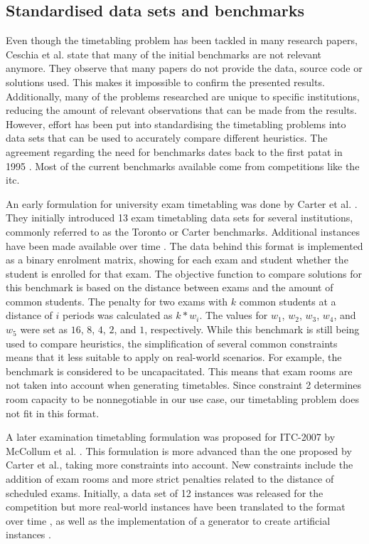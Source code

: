 \subsection{Standardised data sets and benchmarks}

Even though the timetabling problem has been tackled in many research papers, Ceschia et al.\cite{ceschia2022} state that many of the initial benchmarks are not relevant anymore. They observe that many papers do not provide the data, source code or solutions used. This makes it impossible to confirm the presented results. Additionally, many of the problems researched are unique to specific institutions, reducing the amount of relevant observations that can be made from the results. However, effort has been put into standardising the timetabling problems into data sets that can be used to accurately compare different heuristics. The agreement regarding the need for benchmarks dates back to the first \acrfull{patat} in 1995 \cite{cumming1995}. Most of the current benchmarks available come from competitions like the \acrfull{itc}.

An early formulation for university exam timetabling was done by Carter et al. \cite{carter1996}. They initially introduced 13 exam timetabling data sets for several institutions, commonly referred to as the Toronto or Carter benchmarks. Additional instances have been made available over time \cite{bellio2021}. The data behind this format is implemented as a binary enrolment matrix, showing for each exam and student whether the student is enrolled for that exam. The objective function to compare solutions for this benchmark is based on the distance between exams and the amount of common students. The penalty for two exams with $k$ common students at a distance of $i$ periods was calculated as $k*w_{i}$. The values for $w_1$, $w_2$, $w_3$, $w_4$, and $w_5$ were set as $16$, $8$, $4$, $2$, and $1$, respectively. While this benchmark is still being used to compare heuristics, the simplification of several common constraints means that it less suitable to apply on real-world scenarios. For example, the benchmark is considered to be uncapacitated. This means that exam rooms are not taken into account when generating timetables. Since constraint 2 determines room capacity to be nonnegotiable in our use case, our timetabling problem does not fit in this format.

A later examination timetabling formulation was proposed for ITC-2007 by McCollum et al. \cite{mccollum2007}. This formulation is more advanced than the one proposed by Carter et al., taking more constraints into account. New constraints include the addition of exam rooms and more strict penalties related to the distance of scheduled exams. Initially, a data set of 12 instances was released for the competition but more real-world instances have been translated to the format over time \cite{parkes2010}, as well as the implementation of a generator to create artificial instances \cite{battistutta2017}.


